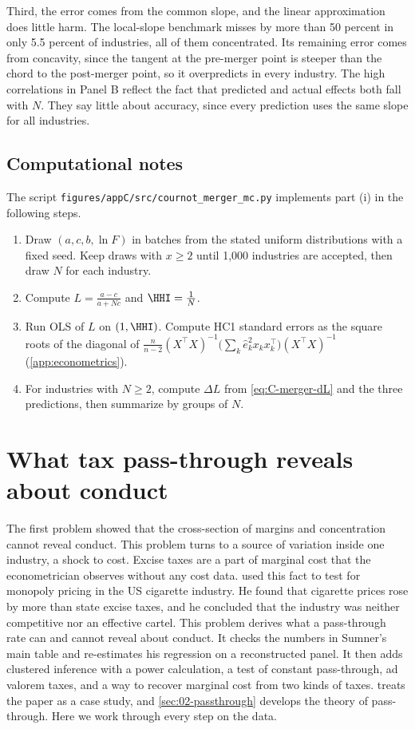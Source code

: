 Third, the error comes from the common slope, and the linear approximation does little harm. The local-slope
benchmark misses by more than
50 percent in only 5.5 percent of industries, all of them concentrated. Its remaining error comes from
concavity, since the tangent at the pre-merger point is steeper than the chord to the post-merger point, so it
overpredicts in every industry. The high correlations in Panel B reflect the fact that predicted and actual
effects both fall with $N$. They say little about accuracy, since every prediction uses the same slope for all
industries.

\subsection{Computational notes}\label{sec:C-cournot-computation}

The script \texttt{figures/appC/src/cournot\_merger\_mc.py} implements part (i) in the following steps.
\begin{enumerate}
\item Draw $(a, c, b, \ln F)$ in batches from the stated uniform distributions with a fixed seed. Keep draws with
  $x \ge 2$ until 1,000 industries are accepted, then draw $N$ for each industry.
\item Compute $L = \frac{a - c}{a + Nc}$ and $\HHI = \frac{1}{N}$.
\item Run OLS of $L$ on $(1, \HHI)$. Compute HC1 standard errors as the square roots of the diagonal of
  $\frac{n}{n - 2}(X^\top X)^{-1}\big(\sum_k \hat e_k^2 x_kx_k^\top\big)(X^\top X)^{-1}$ (\cref{app:econometrics}).
\item For industries with $N \ge 2$, compute $\Delta L$ from \eqref{eq:C-merger-dL} and the three predictions,
  then summarize by groups of $N$.
\end{enumerate}

\section{What tax pass-through reveals about conduct}\label{sec:C-passthrough}

The first problem showed that the cross-section of margins and concentration cannot reveal conduct. This problem
turns to a source of variation inside one industry, a shock to cost. Excise taxes are a part of marginal cost that
the econometrician observes without any cost data. \citet{Sumner1981} used this fact to test for monopoly pricing in the US cigarette industry. He found that cigarette
prices rose by more than state excise taxes, and he concluded that the industry was neither competitive nor an
effective cartel. This problem derives what a pass-through rate can and cannot reveal about conduct. It checks the
numbers in Sumner's main table and re-estimates his regression on a reconstructed panel. It then adds clustered
inference with a power calculation, a test of constant pass-through, ad valorem taxes, and a way to recover
marginal cost from two kinds of taxes.  treats the paper as a case study, and
\cref{sec:02-passthrough} develops the theory of pass-through. Here we work through every step on the data.

